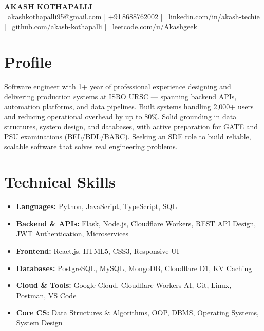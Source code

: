 \documentclass[a4paper,10pt]{article}
\newcommand{\iconbadge}[1]{%
  \tikz[baseline=-0.55ex]{\node[circle,fill=myblue,text=white,font=\bfseries\fontsize{5}{5}\selectfont,inner sep=1.3pt,minimum size=10pt]{#1};}%
}
\begin{document}
\begin{center}
  {\LARGE \textbf{AKASH KOTHAPALLI}}\\[5pt]
  {\small
    \iconbadge{@}~\href{mailto:akashkothapalli95@gmail.com}{akashkothapalli95@gmail.com}
    \enspace\textcolor{myblue}{|}\enspace
    +91\,8688762002
    \enspace\textcolor{myblue}{|}\enspace
    \iconbadge{in}~\href{https://www.linkedin.com/in/akash-techie}{linkedin.com/in/akash-techie}
    \enspace\textcolor{myblue}{|}\enspace
    \iconbadge{gh}~\href{https://github.com/akash-kothapalli}{github.com/akash-kothapalli}
    \enspace\textcolor{myblue}{|}\enspace
    \iconbadge{lc}~\href{https://leetcode.com/u/Akashgeek}{leetcode.com/u/Akashgeek}
  }
\end{center}

\section*{Profile}
Software engineer with 1+ year of professional experience designing and delivering production systems at ISRO URSC --- spanning backend APIs, automation platforms, and data pipelines. Built systems handling 2,000+ users and reducing operational overhead by up to 80\%. Solid grounding in data structures, system design, and databases, with active preparation for GATE and PSU examinations (BEL/BDL/BARC). Seeking an SDE role to build reliable, scalable software that solves real engineering problems.

\section*{Technical Skills}
\begin{itemize}
\item \textbf{Languages:} Python, JavaScript, TypeScript, SQL
\item \textbf{Backend \& APIs:} Flask, Node.js, Cloudflare Workers, REST API Design, JWT Authentication, Microservices
\item \textbf{Frontend:} React.js, HTML5, CSS3, Responsive UI
\item \textbf{Databases:} PostgreSQL, MySQL, MongoDB, Cloudflare D1, KV Caching
\item \textbf{Cloud \& Tools:} Google Cloud, Cloudflare Workers AI, Git, Linux, Postman, VS Code
\item \textbf{Core CS:} Data Structures \& Algorithms, OOP, DBMS, Operating Systems, System Design
\end{itemize}
\end{document}
